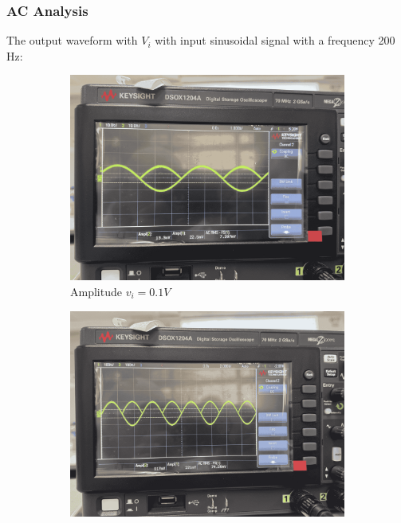     \subsubsection{AC Analysis}
    The output waveform with $V_i$ with input sinusoidal signal with a frequency 200 Hz:\par
    \begin{figure}[H]
        \centering
        \begin{subfigure}{0.3\linewidth}
            \includegraphics[width=1\linewidth]{Experiment_14/Images/lab14_0-1v.png}
            \caption{Amplitude $v_i=0.1V$}
            \label{wave:14-AC0}
        \end{subfigure}
        \begin{subfigure}{0.3\linewidth}
            \includegraphics[width=1\linewidth]{Experiment_14/Images/lab14_1v.png}

\end{subfigure}
\end{figure}
